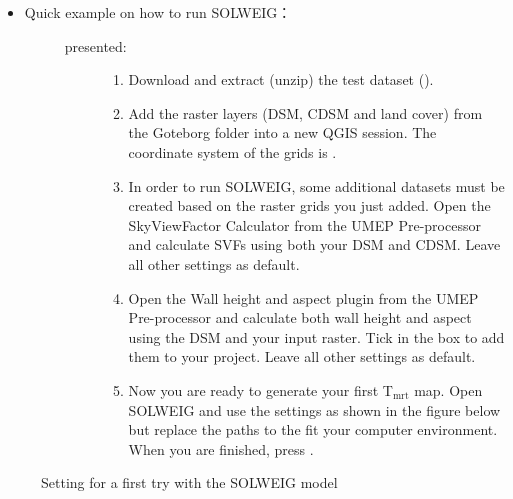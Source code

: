 \documentclass[letterpaper,10pt,english]{sphinxmanual}
\begin{document}
\begin{itemize}
\item {} \begin{description}
\item[{Quick example on how to run SOLWEIG：}] \leavevmode\begin{description}
\item[{presented:}] \leavevmode\begin{enumerate}
\item {} 
Download and extract (unzip) the test dataset ().

\item {} 
Add the raster layers (DSM, CDSM and land cover) from the Goteborg folder into a new QGIS session. The coordinate system of the grids is .

\item {} 
In order to run SOLWEIG, some additional datasets must be created based on the raster grids you just added. Open the SkyViewFactor Calculator from the UMEP Pre-processor and calculate SVFs using both your DSM and CDSM. Leave all other settings as default.

\item {} 
Open the Wall height and aspect plugin from the UMEP Pre-processor and calculate both wall height and aspect using the DSM and your input raster. Tick in the box to add them to your project. Leave all other settings as default.

\item {} 
Now you are ready to generate your first T$_{\text{mrt}}$ map. Open SOLWEIG and use the settings as shown in the figure below but replace the paths to the fit your computer environment. When you are finished, press .

\end{enumerate}

\end{description}

\end{description}

\end{itemize}

\begin{figure}[htbp]
\centering
\capstart

\noindent{}
\caption{Setting for a first try with the SOLWEIG model}\label{\detokenize{processor/Outdoor Thermal Comfort SOLWEIG:id2}}\end{figure}
\end{document}
